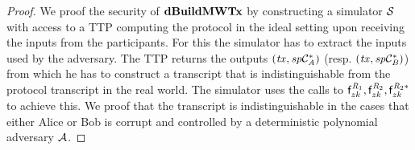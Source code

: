 \begin{proof}
    \label{prf:atom:sec-dbuildmw}
    We proof the security of $\mathbf{dBuildMWTx}$ by constructing a simulator $\mathcal{S}$ with access to a TTP computing the protocol in the ideal setting upon receiving the inputs from the participants.
    For this the simulator has to extract the inputs used by the adversary.
    The TTP returns the outputs $(\mathit{tx}, \mathit{sp}\mathcal{C}_{\mathit{A}}^*)$ (resp. $(\mathit{tx}, \mathit{sp}\mathcal{C}_{\mathit{B}}^*)$) from which he has to construct a transcript that is indistinguishable from the protocol transcript in the real world. The simulator uses the calls to $\mathsf{f}^{\mathit{R}_1}_{zk}, \mathsf{f}^{\mathit{R}_2}_{zk}, \mathsf{f}^{\mathit{R}_2*}_{zk}$ to achieve this.
    We proof that the transcript is indistinguishable in the cases that either Alice or Bob is corrupt and controlled by a deterministic polynomial adversary $\mathcal{A}$.


\end{proof}
